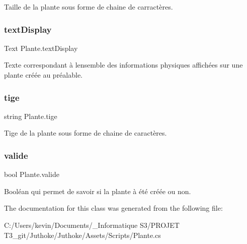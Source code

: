 Taille de la plante sous forme de chaine de carractères. \mbox{\label{class_plante_af0250d69ce2260010e6a0f95af0c07ce}} 
\subsubsection{\texorpdfstring{text\+Display}{textDisplay}}
{\footnotesize\ttfamily Text Plante.\+text\+Display}

Texte correspondant à l\textquotesingle{}ensemble des informations physiques affichées sur une plante créée au préalable. \mbox{\label{class_plante_a650c0b77797fc665e097edd0f456e3e9}} 
\subsubsection{\texorpdfstring{tige}{tige}}
{\footnotesize\ttfamily string Plante.\+tige}

Tige de la plante sous forme de chaine de caractères. \mbox{\label{class_plante_ab6bc3966db0acef8fda5e1cda03699db}} 
\subsubsection{\texorpdfstring{valide}{valide}}
{\footnotesize\ttfamily bool Plante.\+valide}

Booléan qui permet de savoir si la plante à été créée ou non. 

The documentation for this class was generated from the following file\+:\begin{DoxyCompactItemize}
\item 
C\+:/\+Users/kevin/\+Documents/\+\_\+\+Informatique S3/\+P\+R\+O\+J\+E\+T T3\+\_\+git/\+Juthoke/\+Juthoke/\+Assets/\+Scripts/Plante.\+cs\end{DoxyCompactItemize}
